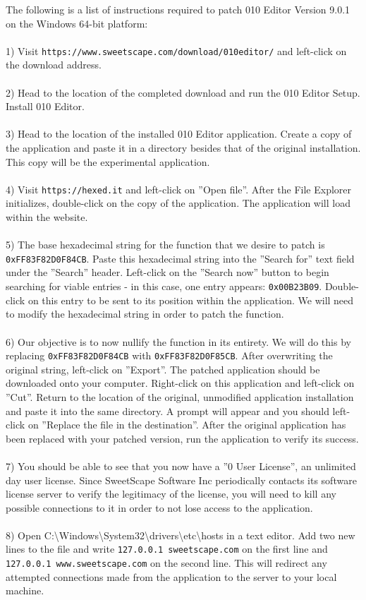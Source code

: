 \documentclass[12pt]{article}
\begin{document}
The following is a list of instructions required to patch 010 Editor Version 9.0.1 on the Windows 64-bit platform: \\ \\
1) Visit \texttt{https://www.sweetscape.com/download/010editor/} and left-click on the download address. \\ \\
2) Head to the location of the completed download and run the 010 Editor Setup. Install 010 Editor. \\ \\
3) Head to the location of the installed 010 Editor application. Create a copy of the application and paste it in a directory besides that of the original installation. This copy will be the experimental application. \\ \\
4) Visit \texttt{https://hexed.it} and left-click on ”Open file”. After the File Explorer initializes, double-click on the copy of the application. The application will load within the website. \\ \\
5) The base hexadecimal string for the function that we desire to patch is \texttt{0xFF83F82D0F84CB}. Paste this hexadecimal string into the ”Search for” text field under the ”Search” header. Left-click on the ”Search now” button to begin searching for viable entries - in this case, one entry appears: \texttt{0x00B23B09}. Double-click on this entry to be sent to its position within the application. We will need to modify the hexadecimal string in order to patch the function. \\ \\
6) Our objective is to now nullify the function in its entirety. We will do this by replacing \texttt{0xFF83F82D0F84CB} with \texttt{0xFF83F82D0F85CB}. After overwriting the original string, left-click on ”Export”. The patched application should be downloaded onto your computer. Right-click on this application and left-click on ”Cut”. Return to the location of the original, unmodified application installation and paste it into the same directory. A prompt will appear and you should left-click on ”Replace the file in the destination”. After the original application has been replaced with your patched version, run the application to verify its success. \\ \\
7) You should be able to see that you now have a ”0 User License”, an unlimited day user license. Since SweetScape Software Inc periodically contacts its software license server to verify the legitimacy of the license, you will need to kill any possible connections to it in order to not lose access to the application. \\ \\
8) Open C:\textbackslash Windows\textbackslash System32\textbackslash drivers\textbackslash etc\textbackslash hosts in a text editor. Add two new lines to the file and write \texttt{127.0.0.1 sweetscape.com} on the first line and \texttt{127.0.0.1 www.sweetscape.com} on the second line. This will redirect any attempted connections made from the application to the server to your local machine.
\end{document}
